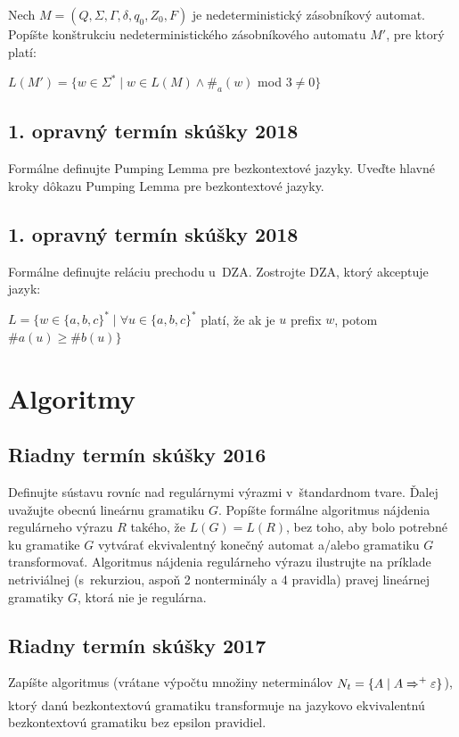 \documentclass[11pt,a4paper]{article}
\begin{document}
		Nech $M = (Q, \Sigma, \Gamma, \delta, q_0, Z_0, F)$ je nedeterministický zásobníkový automat. Popíšte konštrukciu nedeterministického zásobníkového automatu $M'$, pre ktorý platí:

		$L(M') = \{w \in \Sigma^* \mid w \in L(M) \land \#_a(w)$ mod $3 \neq 0\}$

		\subsection{1. opravný termín skúšky 2018}

		Formálne definujte Pumping Lemma pre bezkontextové jazyky. Uveďte hlavné kroky dôkazu Pumping Lemma pre bezkontextové jazyky.

		\subsection{1. opravný termín skúšky 2018}

		Formálne definujte reláciu prechodu u~DZA. Zostrojte DZA, ktorý akceptuje jazyk:

		$L = \{w \in \{a,b,c\}^* \mid \forall u \in \{a,b,c\}^*$ platí, že ak je $u$ prefix $w$, potom $\#a(u) \geq \#b(u)\}$

	\section{Algoritmy}

		\subsection{Riadny termín skúšky 2016}

		Definujte sústavu rovníc nad regulárnymi výrazmi v~štandardnom tvare. Ďalej uvažujte obecnú lineárnu gramatiku $G$. Popíšte formálne algoritmus nájdenia regulárneho výrazu $R$ takého, že $L(G) = L(R)$, bez toho, aby bolo potrebné ku gramatike $G$ vytvárať ekvivalentný konečný automat a/alebo gramatiku $G$ transformovať. Algoritmus nájdenia regulárneho výrazu ilustrujte na príklade netriviálnej (s~rekurziou, aspoň 2 nonterminály a 4 pravidla) pravej lineárnej gramatiky $G$, ktorá nie je regulárna.

		\subsection{Riadny termín skúšky 2017}

		Zapíšte algoritmus (vrátane výpočtu množiny neterminálov $N_t = \{ A \mid A \xRightarrow{}^+ \varepsilon\}$), ktorý danú bezkontextovú gramatiku transformuje na jazykovo ekvivalentnú bezkontextovú gramatiku bez epsilon pravidiel.
\end{document}
